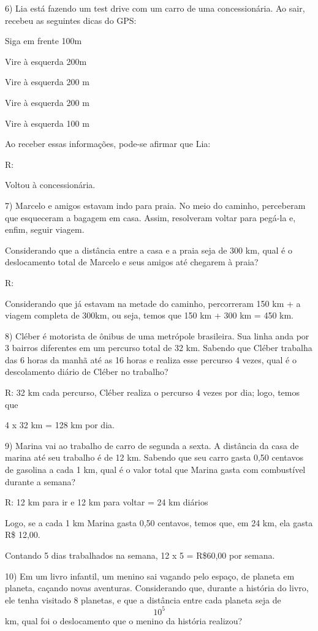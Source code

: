 6) Lia está fazendo um test drive com um carro de uma concessionária. Ao
sair, recebeu as seguintes dicas do GPS:

Siga em frente 100m

Vire à esquerda 200m

Vire à esquerda 200 m

Vire à esquerda 200 m

Vire à esquerda 100 m

Ao receber essas informações, pode-se afirmar que Lia:

R:

Voltou à concessionária.

7) Marcelo e amigos estavam indo para praia. No meio do caminho,
perceberam que esqueceram a bagagem em casa. Assim, resolveram voltar
para pegá-la e, enfim, seguir viagem.

Considerando que a distância entre a casa e a praia seja de 300 km, qual
é o deslocamento total de Marcelo e seus amigos até chegarem à praia?

R:

Considerando que já estavam na metade do caminho, percorreram 150 km + a
viagem completa de 300km, ou seja, temos que 150 km + 300 km = 450 km.

8) Cléber é motorista de ônibus de uma metrópole brasileira. Sua linha
anda por 3 bairros diferentes em um percurso total de 32 km. Sabendo que
Cléber trabalha das 6 horas da manhã até as 16 horas e realiza esse
percurso 4 vezes, qual é o descolamento diário de Cléber no trabalho?

R: 32 km cada percurso, Cléber realiza o percurso 4 vezes por dia; logo,
temos que

4 x 32 km = 128 km por dia.

9) Marina vai ao trabalho de carro de segunda a sexta. A distância da
casa de marina até seu trabalho é de 12 km. Sabendo que seu carro gasta
0,50 centavos de gasolina a cada 1 km, qual é o valor total que Marina
gasta com combustível durante a semana?

R: 12 km para ir e 12 km para voltar = 24 km diários

Logo, se a cada 1 km Marina gasta 0,50 centavos, temos que, em 24 km,
ela gasta R\$ 12,00.

Contando 5 dias trabalhados na semana, 12 x 5 = R\$60,00 por semana.

10) Em um livro infantil, um menino sai vagando pelo espaço, de planeta
em planeta, caçando novas aventuras. Considerando que, durante a
história do livro, ele tenha visitado 8 planetas, e que a distância
entre cada planeta seja de \[10^5\] km, qual foi o deslocamento que o
menino da história realizou?

